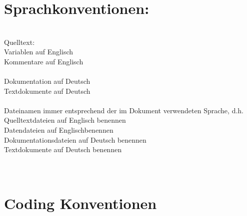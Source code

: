 \begin{}
\section{Sprachkonventionen:}\\
Quelltext:\\
Variablen auf Englisch\\
Kommentare auf Englisch\\
\\
Dokumentation auf Deutsch\\
Textdokumente auf Deutsch\\
\\
Dateinamen immer entsprechend der im Dokument verwendeten Sprache, d.h.\\
Quelltextdateien auf Englisch benennen\\
Datendateien auf Englischbenennen\\
Dokumentationsdateien auf Deutsch benennen\\
Textdokumente auf Deutsch benennen\\
\\
\\
\section{Coding Konventionen}\\
\end{}